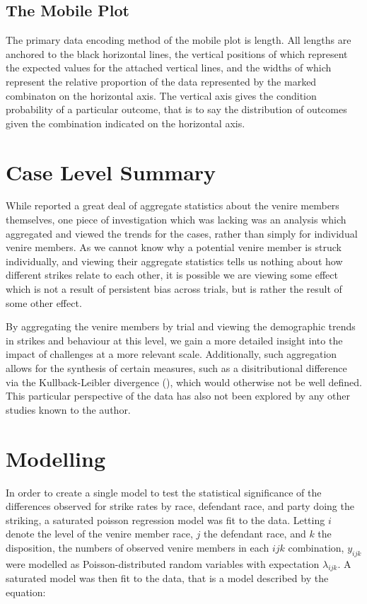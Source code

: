 \subsection{The Mobile Plot} \label{subsec:mobile}

The primary data encoding method of the mobile plot is length. All lengths are anchored to the black horizontal lines, the
vertical positions of which represent the expected values for the attached vertical lines, and the widths of which represent the
relative proportion of the data represented by the marked combinaton on the horizontal axis. The vertical axis gives the condition
probability of a particular outcome, that is to say the distribution of outcomes given the combination indicated on the horizontal
axis.

\section{Case Level Summary} \label{sec:casesum}

While \cite{JurySunshineProj} reported a great deal of aggregate statistics about the venire members themselves, one piece of
investigation which was lacking was an analysis which aggregated and viewed the trends for the cases, rather than simply for
individual venire members. As we cannot know why a potential venire member is struck individually, and viewing their aggregate
statistics tells us nothing about how different strikes relate to each other, it is possible we are viewing some effect which is
not a result of persistent bias across trials, but is rather the result of some other effect.

By aggregating the venire members by trial and viewing the demographic trends in strikes and behaviour at this level, we gain a
more detailed insight into the impact of challenges at a more relevant scale. Additionally, such aggregation allows for the
synthesis of certain measures, such as a disitributional difference via the Kullback-Leibler divergence (\cite{kullback1951}),
which would otherwise not be well defined. This particular perspective of the data has also not been explored by any other studies
known to the author.

\section{Modelling} \label{sec:mods}

In order to create a single model to test the statistical significance of the differences observed for strike rates by race,
defendant race, and party doing the striking, a saturated poisson regression model was fit to the data. Letting $i$ denote the
level of the venire member race, $j$ the defendant race, and $k$ the disposition, the numbers of observed venire members in each
$ijk$ combination, $y_{ijk}$ were modelled as Poisson-distributed random variables with expectation $\lambda_{ijk}$. A saturated
model was then fit to the data, that is a model described by the equation:

